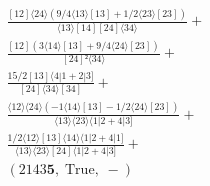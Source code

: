 \documentclass[varwidth, border=5pt]{standalone}
\begin{document}
\begin{my}
$\begin{gathered}
\scriptscriptstyle\frac{[12]⟨24⟩(9/4⟨13⟩[13]+1/2⟨23⟩[23])}{⟨13⟩[14][24]⟨34⟩} +\\
\scriptscriptstyle\frac{[12](3⟨14⟩[13]+9/4⟨24⟩[23])}{[24]²⟨34⟩} +\\
\scriptscriptstyle\frac{15/2[13]⟨4|1+2|3]}{[24]⟨34⟩[34]} +\\
\scriptscriptstyle\frac{⟨12⟩⟨24⟩(-1⟨14⟩[13]-1/2⟨24⟩[23])}{⟨13⟩⟨23⟩⟨1|2+4|3]} +\\
\scriptscriptstyle\frac{1/2⟨12⟩[13]⟨14⟩⟨1|2+4|1]}{⟨13⟩⟨23⟩[24]⟨1|2+4|3]} +\\
\scriptscriptstyle(2143𝟓,\;\text{True},\;-) \phantom{+}
\end{gathered}$
\end{my}
\end{document}

